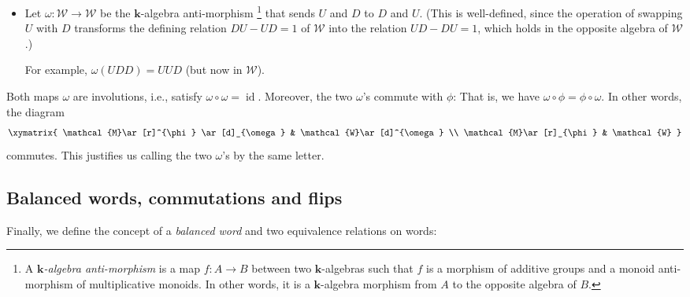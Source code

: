 \documentclass[numbers=enddot,12pt,final,onecolumn,notitlepage]{scrartcl}%
\theoremstyle{definition}
\newcommand{\id}{\operatorname{id}}
\newcommand{\W}{\mathcal{W}}
\newcommand{\M}{\mathcal{M}}
\newcommand{\kk}{\mathbf{k}}
\newcommand{\tup}[1]{\left( #1 \right)}
\begin{document}
\begin{itemize}
\item
Let $\omega : \W \to \W$ be the $\kk$-algebra
anti-morphism%
\footnote{A \emph{$\kk$-algebra anti-morphism} is a map $f : A \to B$ between two $\kk$-algebras such that $f$ is a morphism of additive groups and a monoid anti-morphism of multiplicative monoids. In other words, it is a $\kk$-algebra morphism from $A$ to the opposite algebra of $B$.}
that sends $U$ and $D$ to $D$ and $U$. (This is well-defined,
since the operation of swapping $U$ with $D$ transforms the defining relation $DU-UD=1$ of $\W$ into the relation $UD-DU = 1$, which holds in the opposite algebra of $\W$.)

For example, $\omega\tup{UDD} = UUD$ (but now in $\W$).
\end{itemize}

Both maps $\omega$ are involutions, i.e., satisfy
$\omega \circ \omega = \id$.
Moreover, the two $\omega$'s commute with $\phi$:
That is, we have $\omega\circ\phi =\phi\circ\omega$.
In other words, the diagram
\begin{align}
    \xymatrix{
    \M \ar[r]^{\phi} \ar[d]_{\omega} & \W \ar[d]^{\omega} \\
    \M \ar[r]_{\phi} & \W
    }
    \label{eq.omega.comm}
\end{align}
commutes.
This justifies us calling the two $\omega$'s by the same letter.

\subsection{Balanced words, commutations and flips}

Finally, we define the concept of a \emph{balanced word} and two
equivalence relations on words:
\end{document}

